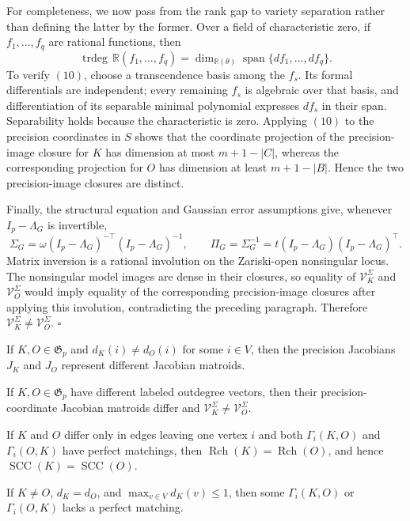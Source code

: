 For completeness, we now pass from the rank gap to variety separation rather than defining the latter by the former.  Over a field of characteristic zero, if \(f_1,\ldots,f_q\) are rational functions, then
\[
 \operatorname{trdeg}\,\mathbb R(f_1,\ldots,f_q)
 =\dim_{\mathbb R(\theta)}\operatorname{span}\{df_1,\ldots,df_q\}.
 \tag{10}
\]
To verify \((10)\), choose a transcendence basis among the \(f_s\).  Its formal differentials are independent; every remaining \(f_s\) is algebraic over that basis, and differentiation of its separable minimal polynomial expresses \(df_s\) in their span.  Separability holds because the characteristic is zero.  Applying \((10)\) to the precision coordinates in \(S\) shows that the coordinate projection of the precision-image closure for \(K\) has dimension at most \(m+1-|C|\), whereas the corresponding projection for \(O\) has dimension at least \(m+1-|B|\).  Hence the two precision-image closures are distinct.

Finally, the structural equation and Gaussian error assumptions give, whenever \(I_p-\Lambda_G\) is invertible,
\[
 \Sigma_G=\omega(I_p-\Lambda_G)^{-\top}(I_p-\Lambda_G)^{-1},
 \qquad
 \Pi_G=\Sigma_G^{-1}=t(I_p-\Lambda_G)(I_p-\Lambda_G)^\top.
\]
Matrix inversion is a rational involution on the Zariski-open nonsingular locus.  The nonsingular model images are dense in their closures, so equality of \(\mathcal V_K^\Sigma\) and \(\mathcal V_O^\Sigma\) would imply equality of the corresponding precision-image closures after applying this involution, contradicting the preceding paragraph.  Therefore \(\mathcal V_K^\Sigma\ne\mathcal V_O^\Sigma\). \(\square\)

If \(K,O\in\mathfrak G_p\) and \(d_K(i)\ne d_O(i)\) for some \(i\in V\), then the precision Jacobians \(J_K\) and \(J_O\) represent different Jacobian matroids.

If \(K,O\in\mathfrak G_p\) have different labeled outdegree vectors, then their precision-coordinate Jacobian matroids differ and \(\mathcal V_K^\Sigma\ne\mathcal V_O^\Sigma\).

If \(K\) and \(O\) differ only in edges leaving one vertex \(i\) and both \(\Gamma_i(K,O)\) and \(\Gamma_i(O,K)\) have perfect matchings, then \(\operatorname{Rch}(K)=\operatorname{Rch}(O)\), and hence \(\operatorname{SCC}(K)=\operatorname{SCC}(O)\).

If \(K\ne O\), \(d_K=d_O\), and \(\max_{v\in V}d_K(v)\le1\), then some \(\Gamma_i(K,O)\) or \(\Gamma_i(O,K)\) lacks a perfect matching.

